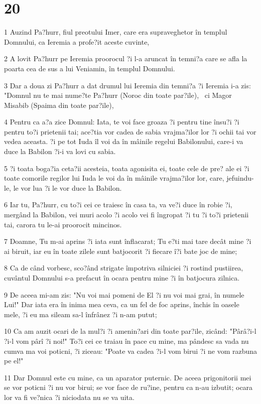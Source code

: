\chapter{20}

\par 1 Auzind Pa?hurr, fiul preotului Imer, care era supraveghetor în templul Domnului, ca Ieremia a profe?it aceste cuvinte,
\par 2 A lovit Pa?hurr pe Ieremia proorocul ?i l-a aruncat în temni?a care se afla la poarta cea de sus a lui Veniamin, în templul Domnului.
\par 3 Dar a doua zi Pa?hurr a dat drumul lui Ieremia din temni?a ?i Ieremia i-a zis: "Domnul nu te mai nume?te Pa?hurr (Noroc din toate par?ile),  ci Magor Misabib (Spaima din toate par?ile),
\par 4 Pentru ca a?a zice Domnul: Iata, te voi face groaza ?i pentru tine însu?i ?i pentru to?i prietenii tai; ace?tia vor cadea de sabia vrajma?ilor lor ?i ochii tai vor vedea aceasta. ?i pe tot Iuda îl voi da în mâinile regelui Babilonului, care-i va duce la Babilon ?i-i va lovi cu sabia.
\par 5 ?i toata boga?ia ceta?ii acesteia, toata agonisita ei, toate cele de pre? ale ei ?i toate comorile regilor lui Iuda le voi da în mâinile vrajma?ilor lor, care, jefuindu-le, le vor lua ?i le vor duce la Babilon.
\par 6 Iar tu, Pa?hurr, cu to?i cei ce traiesc în casa ta, va ve?i duce în robie ?i, mergând la Babilon, vei muri acolo ?i acolo vei fi îngropat ?i tu ?i to?i prietenii tai, carora tu le-ai proorocit mincinos.
\par 7 Doamne, Tu m-ai aprins ?i iata sunt înflacarat; Tu e?ti mai tare decât mine ?i ai biruit, iar eu în toate zilele sunt batjocorit ?i fiecare î?i bate joc de mine;
\par 8 Ca de când vorbesc, sco?ând strigate împotriva silniciei ?i rostind pustiirea, cuvântul Domnului s-a prefacut în ocara pentru mine ?i în batjocura zilnica.
\par 9 De aceea mi-am zis: "Nu voi mai pomeni de El ?i nu voi mai grai, în numele Lui!" Dar iata era în inima mea ceva, ca un fel de foc aprins, închis în oasele mele, ?i eu ma sileam sa-l înfrânez ?i n-am putut;
\par 10 Ca am auzit ocari de la mul?i ?i amenin?ari din toate par?ile, zicând: "Pârâ?i-l ?i-l vom pârî ?i noi!" To?i cei ce traiau în pace cu mine, ma pândesc sa vada nu cumva ma voi poticni, ?i ziceau: "Poate va cadea ?i-l vom birui ?i ne vom razbuna pe el!"
\par 11 Dar Domnul este cu mine, ca un aparator puternic. De aceea prigonitorii mei se vor poticni ?i nu vor birui; se vor face de ru?ine, pentru ca n-au izbutit; ocara lor va fi ve?nica ?i niciodata nu se va uita.
